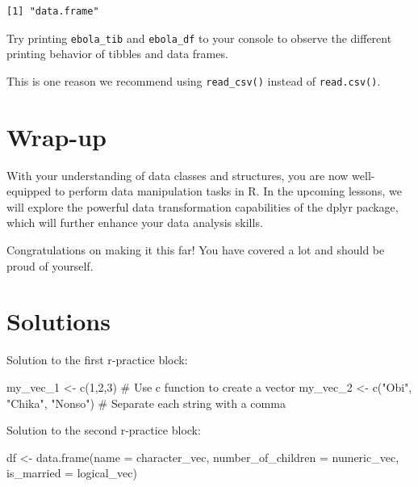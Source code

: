 \documentclass[
  letterpaper,
  DIV=11,
  numbers=noendperiod]{scrreprt}
\newenvironment{Shaded}{\begin{snugshade}}{\end{snugshade}}
\newcommand{\AttributeTok}[1]{\textcolor[rgb]{0.40,0.45,0.13}{#1}}
\newcommand{\CommentTok}[1]{\textcolor[rgb]{0.37,0.37,0.37}{#1}}
\newcommand{\DecValTok}[1]{\textcolor[rgb]{0.68,0.00,0.00}{#1}}
\newcommand{\FunctionTok}[1]{\textcolor[rgb]{0.28,0.35,0.67}{#1}}
\newcommand{\NormalTok}[1]{\textcolor[rgb]{0.00,0.23,0.31}{#1}}
\newcommand{\OtherTok}[1]{\textcolor[rgb]{0.00,0.23,0.31}{#1}}
\newcommand{\StringTok}[1]{\textcolor[rgb]{0.13,0.47,0.30}{#1}}
\begin{document}
\begin{verbatim}
[1] "data.frame"
\end{verbatim}

Try printing \texttt{ebola\_tib} and \texttt{ebola\_df} to your console
to observe the different printing behavior of tibbles and data frames.

This is one reason we recommend using \texttt{read\_csv()} instead of
\texttt{read.csv()}.

\section{Wrap-up}\label{wrap-up-1}

With your understanding of data classes and structures, you are now
well-equipped to perform data manipulation tasks in R. In the upcoming
lessons, we will explore the powerful data transformation capabilities
of the dplyr package, which will further enhance your data analysis
skills.

Congratulations on making it this far! You have covered a lot and should
be proud of yourself.

\section{Solutions}\label{solutions}

Solution to the first r-practice block:

\begin{Shaded}
\begin{Highlighting}[]
\NormalTok{my\_vec\_1 }\OtherTok{\textless{}{-}} \FunctionTok{c}\NormalTok{(}\DecValTok{1}\NormalTok{,}\DecValTok{2}\NormalTok{,}\DecValTok{3}\NormalTok{) }\CommentTok{\# Use \textquotesingle{}c\textquotesingle{} function to create a vector}
\NormalTok{my\_vec\_2 }\OtherTok{\textless{}{-}} \FunctionTok{c}\NormalTok{(}\StringTok{"Obi"}\NormalTok{, }\StringTok{"Chika"}\NormalTok{, }\StringTok{"Nonso"}\NormalTok{) }\CommentTok{\# Separate each string with a comma}
\end{Highlighting}
\end{Shaded}

Solution to the second r-practice block:

\begin{Shaded}
\begin{Highlighting}[]
\NormalTok{df }\OtherTok{\textless{}{-}} \FunctionTok{data.frame}\NormalTok{(}\AttributeTok{name =}\NormalTok{ character\_vec, }
                 \AttributeTok{number\_of\_children =}\NormalTok{ numeric\_vec, }
                 \AttributeTok{is\_married =}\NormalTok{ logical\_vec)}
\end{Highlighting}
\end{Shaded}
\end{document}
